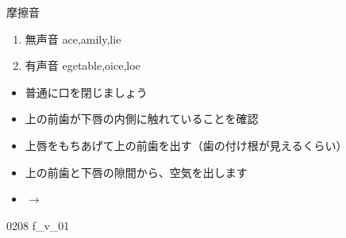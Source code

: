 \documentclass[aspectratio=169, xcolor={dvipsnames,table}]{beamer}
\begin{document}
\begin{frame}[plain,label=slide_f_v]{摩擦音}
  \large

  \begin{enumerate}
    \item<2-> 無声音 \hspace{22pt}ace,\hspace{1\zw}amily,\hspace{1\zw}lie

    \item<3-> 有声音 \hspace{20pt}egetable,\hspace{1\zw}oice,\hspace{1\zw}loe
  \end{enumerate}

  \vspace*{15pt}

  \normalsize {}

  \begin{itemize}
    [circle]

    \item<5-> 普通に口を閉じましょう

    \item<6-> 上の前歯が下唇の内側に触れていることを確認

    \item<7-> 上唇をもちあげて上の前歯を出す（歯の付け根が見えるくらい）

    \item<8-> 上の前歯と下唇の隙間から、空気を出します

    \item<9->  $\longrightarrow$ 
  \end{itemize}

  \vspace{-10pt}

  \hfill{\tiny 0208}\,{\scriptsize {}}\,{\tiny f\_v\_01}

\end{frame}
\end{document}
